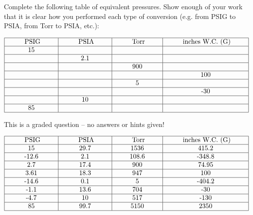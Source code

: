 

Complete the following table of equivalent pressures.  Show enough of your work that it is clear how you performed each type of conversion (e.g. from PSIG to PSIA, from Torr to PSIA, etc.):


$$\vbox{\offinterlineskip
\halign{\strut
\vrule \quad\hfil # \ \hfil & 
\vrule \quad\hfil # \ \hfil & 
\vrule \quad\hfil # \ \hfil & 
\vrule \quad\hfil # \ \hfil \vrule \cr
\noalign{\hrule}
%
\hskip 20pt PSIG \hskip 20pt & \hskip 20pt PSIA \hskip 20pt & \hskip 20pt Torr \hskip 20pt & \hskip 20pt inches W.C. (G) \hskip 20pt \cr
%
\noalign{\hrule}
%
15 &  &  &  \cr
%
\noalign{\hrule}
%
  & 2.1 &  &  \cr
%
\noalign{\hrule}
%
  &  & 900 &  \cr
%
\noalign{\hrule}
%
  &  &  & 100 \cr
%
\noalign{\hrule}
%
  &  & 5 &  \cr
%
\noalign{\hrule}
%
  &  &  & -30 \cr
%
\noalign{\hrule}
%
  & 10 &  &  \cr
%
\noalign{\hrule}
%
85  &  &  &  \cr
%
\noalign{\hrule}
} %
}$$ %

\vfil 

\eject






This is a graded question -- no answers or hints given!








$$\vbox{\offinterlineskip
\halign{\strut
\vrule \quad\hfil # \ \hfil & 
\vrule \quad\hfil # \ \hfil & 
\vrule \quad\hfil # \ \hfil & 
\vrule \quad\hfil # \ \hfil \vrule \cr
\noalign{\hrule}
%
\hskip 20pt PSIG \hskip 20pt & \hskip 20pt PSIA \hskip 20pt & \hskip 20pt Torr \hskip 20pt & \hskip 20pt inches W.C. (G) \hskip 20pt \cr
%
\noalign{\hrule}
%
15 & 29.7 & 1536 & 415.2 \cr
%
\noalign{\hrule}
%
-12.6 & 2.1 & 108.6 & -348.8 \cr
%
\noalign{\hrule}
%
2.7 & 17.4 & 900 & 74.95 \cr
%
\noalign{\hrule}
%
3.61 & 18.3 & 947 & 100 \cr
%
\noalign{\hrule}
%
-14.6 & 0.1 & 5 & -404.2 \cr
%
\noalign{\hrule}
%
-1.1 & 13.6 & 704 & -30 \cr
%
\noalign{\hrule}
%
-4.7 & 10 & 517 & -130 \cr
%
\noalign{\hrule}
%
85 & 99.7 & 5150 & 2350 \cr
%
\noalign{\hrule}
} %
}$$ %




